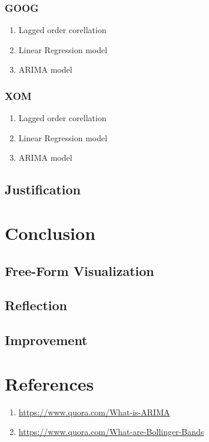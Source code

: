 \documentclass[11pt]{article}
\providecommand{\tightlist}{%
      \setlength{\itemsep}{0pt}\setlength{\parskip}{0pt}}
\begin{document}
\subsubsection{GOOG}\label{goog}

\begin{enumerate}
\def\labelenumi{\arabic{enumi}.}
\item
  Lagged order corellation
\item
  Linear Regression model
\item
  ARIMA model
\end{enumerate}

\subsubsection{XOM}\label{xom}

\begin{enumerate}
\def\labelenumi{\arabic{enumi}.}
\item
  Lagged order corellation
\item
  Linear Regression model
\item
  ARIMA model
\end{enumerate}

\subsection{Justification}\label{justification}

\section{Conclusion}\label{conclusion}

\subsection{Free-Form Visualization}\label{free-form-visualization}

\subsection{Reflection}\label{reflection}

\subsection{Improvement}\label{improvement}

\section{References}\label{references}

\begin{enumerate}
\def\labelenumi{\arabic{enumi}.}
\tightlist
\item
  \url{https://www.quora.com/What-is-ARIMA}
\item
  \url{https://www.quora.com/What-are-Bollinger-Bands}
\end{enumerate}


    
    
    
    
\end{document}
